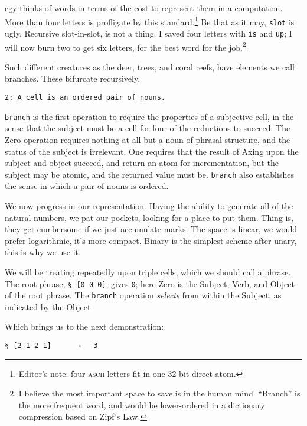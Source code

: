 \documentclass[twoside]{article}
\begin{document}
cgy thinks of words in terms of the cost to represent them in a computation. More than four letters is profligate by this standard.\footnote{Editor's note:  four \textsc{ascii} letters fit in one 32-bit direct atom.} Be that as it may, \texttt{slot} is ugly. Recursive slot-in-slot, is not a thing. I saved four letters with \texttt{is} and \texttt{up}; I will now burn two to get six letters, for the best word for the job.\footnote{I believe the most important space to save is in the human mind. ``Branch'' is the more frequent word, and would be lower-ordered in a dictionary compression based on Zipf's Law.}

Such different creatures as the deer, trees, and coral reefs, have elements we call branches. These bifurcate recursively.

\begin{lstlisting}[style=listingblock]
2: A cell is an ordered pair of nouns.
\end{lstlisting}

\texttt{branch} is the first operation to require the properties of a subjective cell, in the sense that the subject must be a cell for four of the reductions to succeed. The Zero operation requires nothing at all but a noun of phrasal structure, and the status of the subject is irrelevant. One requires that the result of Axing upon the subject and object succeed, and return an atom for incrementation, but the subject may be atomic, and the returned value must be.  \texttt{branch} also establishes the sense in which a pair of nouns is ordered.

We now progress in our representation. Having the ability to generate all of the natural numbers, we pat our pockets, looking for a place to put them. Thing is, they get cumbersome if we just accumulate marks. The space is linear, we would prefer logarithmic, it's more compact. Binary is the simplest scheme after unary, this is why we use it.

We will be treating repeatedly upon triple cells, which we should call a phrase. The root phrase, \lstinline[style=inlinecode]{§ [0 0 0]}, gives \texttt{0}; here Zero is the Subject, Verb, and Object of the root phrase. The \texttt{branch} operation \emph{selects} from within the Subject, as indicated by the Object.

Which brings us to the next demonstration:

\begin{lstlisting}[style=listingcode]
§ [2 1 2 1]      →   3
\end{lstlisting}
\end{document}
